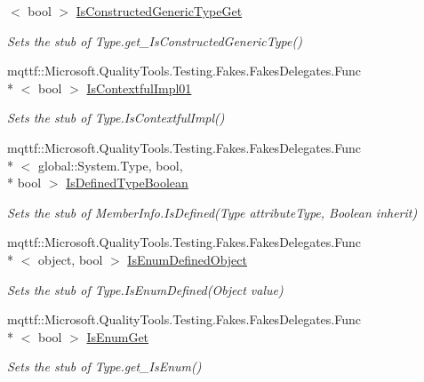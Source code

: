 \begin{DoxyCompactItemize}
$<$ bool $>$ \hyperlink{class_system_1_1_fakes_1_1_stub_type_ac0de01dd135e6d2cba6b581e098e1a60}{Is\-Constructed\-Generic\-Type\-Get}
\begin{DoxyCompactList}\small\item\em Sets the stub of Type.\-get\-\_\-\-Is\-Constructed\-Generic\-Type()\end{DoxyCompactList}\item 
mqttf\-::\-Microsoft.\-Quality\-Tools.\-Testing.\-Fakes.\-Fakes\-Delegates.\-Func\\*
$<$ bool $>$ \hyperlink{class_system_1_1_fakes_1_1_stub_type_aca44e770ef4e6e4d58d62602aaa12551}{Is\-Contextful\-Impl01}
\begin{DoxyCompactList}\small\item\em Sets the stub of Type.\-Is\-Contextful\-Impl()\end{DoxyCompactList}\item 
mqttf\-::\-Microsoft.\-Quality\-Tools.\-Testing.\-Fakes.\-Fakes\-Delegates.\-Func\\*
$<$ global\-::\-System.\-Type, bool, \\*
bool $>$ \hyperlink{class_system_1_1_fakes_1_1_stub_type_a13e8a57704f673b59d740251ab0176cc}{Is\-Defined\-Type\-Boolean}
\begin{DoxyCompactList}\small\item\em Sets the stub of Member\-Info.\-Is\-Defined(\-Type attribute\-Type, Boolean inherit)\end{DoxyCompactList}\item 
mqttf\-::\-Microsoft.\-Quality\-Tools.\-Testing.\-Fakes.\-Fakes\-Delegates.\-Func\\*
$<$ object, bool $>$ \hyperlink{class_system_1_1_fakes_1_1_stub_type_a91aaa0300476e10198747e80250f04f7}{Is\-Enum\-Defined\-Object}
\begin{DoxyCompactList}\small\item\em Sets the stub of Type.\-Is\-Enum\-Defined(\-Object value)\end{DoxyCompactList}\item 
mqttf\-::\-Microsoft.\-Quality\-Tools.\-Testing.\-Fakes.\-Fakes\-Delegates.\-Func\\*
$<$ bool $>$ \hyperlink{class_system_1_1_fakes_1_1_stub_type_a3b5ebd0187a6ef22a854d7366ab4cb9f}{Is\-Enum\-Get}
\begin{DoxyCompactList}\small\item\em Sets the stub of Type.\-get\-\_\-\-Is\-Enum()\end{DoxyCompactList}\item 

\end{DoxyCompactItemize}
